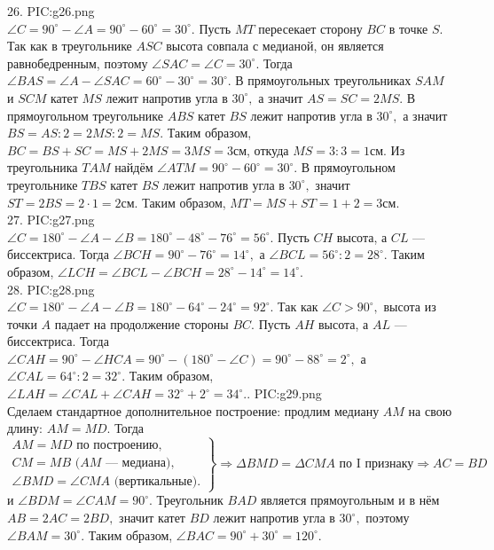26. {{PIC:g26.png}}\\
$\angle C=90^\circ-\angle A=90^\circ-60^\circ=30^\circ.$ Пусть $MT$ пересекает сторону $BC$ в точке $S.$ Так как в треугольнике $ASC$ высота совпала с медианой, он является равнобедренным, поэтому $\angle SAC=\angle C=30^\circ.$ Тогда $\angle BAS=\angle A-\angle SAC=60^\circ-30^\circ=30^\circ.$ В прямоугольных треугольниках $SAM$ и $SCM$ катет $MS$ лежит напротив угла в $30^\circ,$ а значит $AS=SC=2MS.$ В прямоугольном треугольнике $ABS$ катет $BS$ лежит напротив угла
в $30^\circ,$ а значит $BS=AS:2=2MS:2=MS.$ Таким образом, $BC=BS+SC=MS+2MS=3MS=3$см, откуда $MS=3:3=1$см. Из треугольника $TAM$ найдём $\angle ATM=90^\circ-60^\circ=30^\circ.$ В прямоугольном треугольнике $TBS$ катет $BS$ лежит напротив угла в $30^\circ,$ значит $ST=2BS=2\cdot1=2$см. Таким образом, $MT=MS+ST=1+2=3$см.\\
27. {{PIC:g27.png}}\\
$\angle C=180^\circ-\angle A-\angle B=180^\circ-48^\circ-76^\circ=56^\circ.$ Пусть $CH$ высота, а $CL$ --- биссектриса. Тогда $\angle BCH=90^\circ-76^\circ=14^\circ,$ а $\angle BCL=56^\circ:2=28^\circ.$ Таким образом, $\angle LCH=\angle BCL- \angle BCH=28^\circ-14^\circ=14^\circ.$\\
28. {{PIC:g28.png}}\\
$\angle C=180^\circ-\angle A-\angle B=180^\circ-64^\circ-24^\circ=92^\circ.$ Так как $\angle C>90^\circ,$ высота из точки $A$ падает на продолжение стороны $BC.$   Пусть $AH$ высота, а $AL$ --- биссектриса. Тогда $\angle CAH=90^\circ-\angle HCA=90^\circ-(180^\circ-\angle C)=90^\circ-88^\circ=2^\circ,$ а $\angle CAL=64^\circ:2=32^\circ.$ Таким образом, $\angle LAH=\angle CAL+ \angle CAH=32^\circ+2^\circ=34^\circ.$\newpage{}. {{PIC:g29.png}}\\
Сделаем стандартное дополнительное построение: продлим медиану $AM$ на свою длину: $AM=MD.$ Тогда $\left.\begin{array}{l}AM=MD\text{ по построению},\\
 CM=MB\text{ ($AM$ --- медиана)},\\ \angle BMD=\angle CMA\text{ (вертикальные).}\end{array}\right\}\Rightarrow
\Delta BMD=\Delta CMA\text{ по I признаку}\Rightarrow AC=BD$ и $\angle BDM=\angle CAM=90^\circ.$ Треугольник $BAD$ является прямоугольным и в нём $AB=2AC=2BD,$ значит катет $BD$ лежит напротив угла в $30^\circ,$ поэтому $\angle BAM=30^\circ.$ Таким образом, $\angle BAC=90^\circ+30^\circ=120^\circ.$\\

